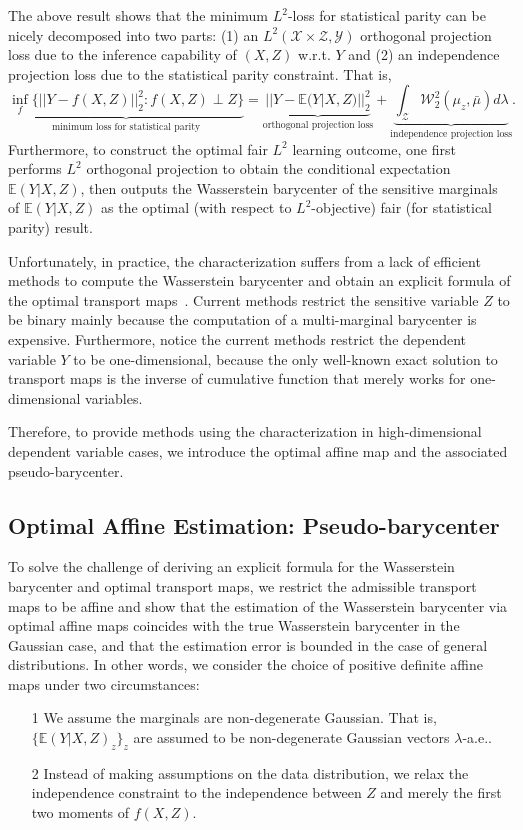 \documentclass[twoside,11pt]{article}
\begin{document}
The above result shows that the minimum $L^2$-loss for statistical parity can be nicely decomposed into two parts: (1) an $L^2(\mathcal{X} \times \mathcal{Z},\mathcal{Y})$ orthogonal projection loss due to the inference capability of $(X,Z)$ w.r.t. $Y$ and (2) an independence projection loss due to the statistical parity constraint. That is, $$\underbrace{\inf_{f} \{||Y - f(X,Z)||_2^2 : f(X,Z) \perp Z\}}_{\text{minimum loss for statistical parity}} =  \underbrace{||Y - \mathbb{E}(Y|X,Z)||_2^2}_{\text{orthogonal projection loss}} + \underbrace{\int_{\mathcal{Z}} \mathcal{W}_2^2(\mu_z, \bar{\mu}) d\lambda}_{\text{independence projection loss}}.$$ Furthermore, to construct the optimal fair $L^2$ learning outcome, one first performs $L^2$ orthogonal projection to obtain the conditional expectation $\mathbb{E}(Y|X,Z)$, then outputs the Wasserstein barycenter of the sensitive marginals of $\mathbb{E}(Y|X,Z)$ as the optimal (with respect to $L^2$-objective) fair (for statistical parity) result. 

Unfortunately, in practice, the characterization suffers from a lack of efficient methods to compute the Wasserstein barycenter and obtain an explicit formula of the optimal transport maps~\cite{altschuler2022wasserstein}. Current methods restrict the sensitive variable $Z$ to be binary mainly because the computation of a multi-marginal barycenter is expensive. Furthermore, notice the current methods restrict the dependent variable $Y$ to be one-dimensional, because the only well-known exact solution to transport maps is the inverse of cumulative function that merely works for one-dimensional variables.

Therefore, to provide methods using the characterization in high-dimensional dependent variable cases, we introduce the optimal affine map and the associated pseudo-barycenter.

\subsection{Optimal Affine Estimation: Pseudo-barycenter} \label{s:affine estimate}

To solve the challenge of deriving an explicit formula for the Wasserstein barycenter and optimal transport maps, we restrict the admissible transport maps to be affine and show that the estimation of the Wasserstein barycenter via optimal affine maps coincides with the true Wasserstein barycenter in the Gaussian case, and that the estimation error is bounded in the case of general distributions. In other words, we consider the choice of positive definite affine maps under two circumstances:
\begin{itemize}
\item[1] We assume the marginals are non-degenerate Gaussian. That is, $\{\mathbb{E}(Y|X,Z)_z\}_z$ are assumed to be non-degenerate Gaussian vectors $\lambda$-a.e..
\item[2] Instead of making assumptions on the data distribution, we relax the independence constraint to the independence between $Z$ and merely the first two moments of $f(X,Z)$.
\end{itemize}
\end{document}
